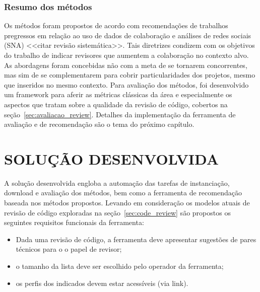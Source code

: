 \documentclass[12pt,openany,oneside,a4paper,english,brazil]{abntbibufjf}
\begin{document}
\subsection{Resumo dos métodos}
Os métodos foram propostos de acordo com recomendações de trabalhos pregressos em relação ao uso de dados de colaboração e análises de redes sociais (SNA) \cite{fu2017, xia2017} <<citar revisão sistemática>>. Tais diretrizes condizem com os objetivos do trabalho de indicar revisores que aumentem a colaboração no contexto alvo. As abordagens foram concebidas não com a meta de se tornarem concorrentes, mas sim de se complementarem para cobrir particularidades dos projetos, mesmo que inseridos no mesmo contexto. Para avaliação dos métodos, foi desenvolvido um framework para aferir as métricas clássicas da área e especialmente os aspectos que tratam sobre a qualidade da revisão de código, cobertos na seção~\ref{sec:avaliacao_review}. Detalhes da implementação da ferramenta de avaliação e de recomendação são o tema do próximo capítulo.


\chapter{SOLUÇÃO DESENVOLVIDA}\label{chap:solucao}
    A solução desenvolvida engloba a automação das tarefas de instanciação, download e avaliação dos métodos, bem como a ferramenta de recomendação baseada nos métodos propostos. Levando em consideração os modelos atuais de revisão de código exploradas na seção~\ref{sec:code_review} são propostos os seguintes requisitos funcionais da ferramenta:
		\begin{itemize}
			\item Dada uma revisão de código, a ferramenta deve apresentar sugestões de pares técnicos para o o papel de revisor;
			\item o tamanho da lista deve ser escolhido pelo operador da ferramenta;
			\item os perfis dos indicados devem estar acessíveis (via link).
		\end{itemize}
\end{document}
